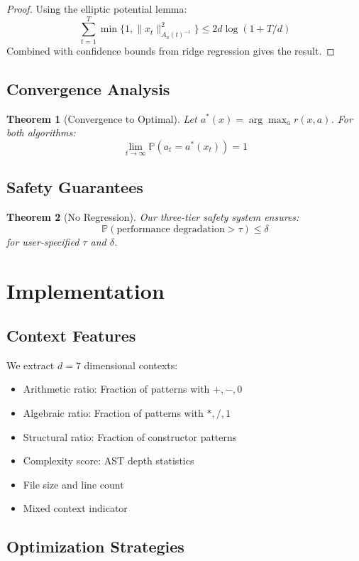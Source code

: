 \documentclass{article}
\theoremstyle{plain}
\newtheorem{theorem}{Theorem}
\theoremstyle{definition}
\begin{document}
\begin{proof}
Using the elliptic potential lemma:
\[
\sum_{t=1}^T \min\{1, \|x_t\|_{A_a(t)^{-1}}^2\} \leq 2d\log(1 + T/d)
\]
Combined with confidence bounds from ridge regression gives the result.
\end{proof}

\subsection{Convergence Analysis}

\begin{theorem}[Convergence to Optimal]
Let $a^*(x) = \arg\max_a r(x,a)$. For both algorithms:
\[
\lim_{t \to \infty} \mathbb{P}(a_t = a^*(x_t)) = 1
\]
\end{theorem}

\subsection{Safety Guarantees}

\begin{theorem}[No Regression]
Our three-tier safety system ensures:
\[
\mathbb{P}(\text{performance degradation} > \tau) \leq \delta
\]
for user-specified $\tau$ and $\delta$.
\end{theorem}

\section{Implementation}

\subsection{Context Features}

We extract $d=7$ dimensional contexts:
\begin{itemize}
\item Arithmetic ratio: Fraction of patterns with $+, -, 0$
\item Algebraic ratio: Fraction of patterns with $*, /, 1$  
\item Structural ratio: Fraction of constructor patterns
\item Complexity score: AST depth statistics
\item File size and line count
\item Mixed context indicator
\end{itemize}

\subsection{Optimization Strategies}
\end{document}
